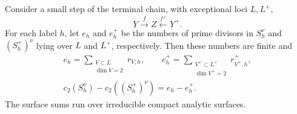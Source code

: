 \begin{lemma}\label{lem:difficulty-ranks}
Consider a small step of the terminal chain, with exceptional loci
\(L,L^+\),
\[
 Y\xrightarrow{f}Z\xleftarrow{f^+}Y^+.
\]
For each label \(h\), let \(e_h\) and \(e_h^+\) be the numbers of prime
divisors in \(S_h^\nu\) and \((S_h^+)^\nu\) lying over \(L\) and
\(L^+\), respectively.  Then these numbers are finite and
\begin{equation}\label{eq:difficulty-rank-change}
 \begin{gathered}
 e_h=\sum_{\substack{V\subset L\\\dim V=2}}r_{V,h},\qquad
 e_h^+=\sum_{\substack{V^+\subset L^+\\\dim V^+=2}}r_{V^+,h}^+,\\
 c_2(S_h^\nu)-c_2((S_h^+)^\nu)=e_h-e_h^+.
 \end{gathered}
\end{equation}
The surface sums run over irreducible compact analytic surfaces.
\end{lemma}

